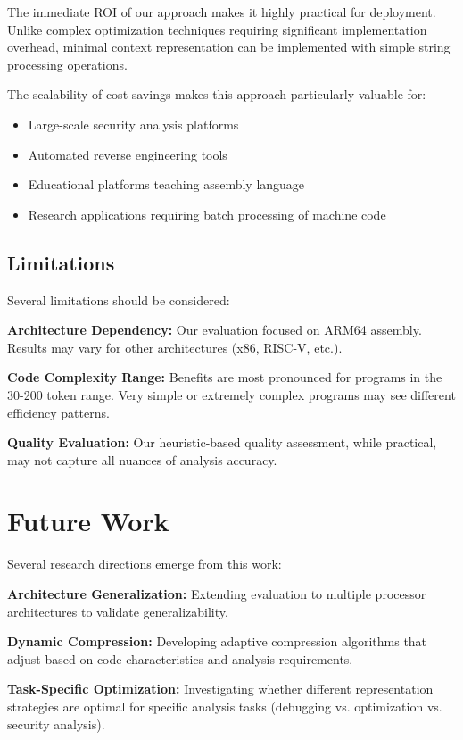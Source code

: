 \documentclass[conference]{IEEEtran}
\begin{document}
The immediate ROI of our approach makes it highly practical for deployment. Unlike complex optimization techniques requiring significant implementation overhead, minimal context representation can be implemented with simple string processing operations.

The scalability of cost savings makes this approach particularly valuable for:
\begin{itemize}
\item Large-scale security analysis platforms
\item Automated reverse engineering tools
\item Educational platforms teaching assembly language
\item Research applications requiring batch processing of machine code
\end{itemize}

\subsection{Limitations}

Several limitations should be considered:

\textbf{Architecture Dependency:} Our evaluation focused on ARM64 assembly. Results may vary for other architectures (x86, RISC-V, etc.).

\textbf{Code Complexity Range:} Benefits are most pronounced for programs in the 30-200 token range. Very simple or extremely complex programs may see different efficiency patterns.

\textbf{Quality Evaluation:} Our heuristic-based quality assessment, while practical, may not capture all nuances of analysis accuracy.

\section{Future Work}

Several research directions emerge from this work:

\textbf{Architecture Generalization:} Extending evaluation to multiple processor architectures to validate generalizability.

\textbf{Dynamic Compression:} Developing adaptive compression algorithms that adjust based on code characteristics and analysis requirements.

\textbf{Task-Specific Optimization:} Investigating whether different representation strategies are optimal for specific analysis tasks (debugging vs. optimization vs. security analysis).
\end{document}
